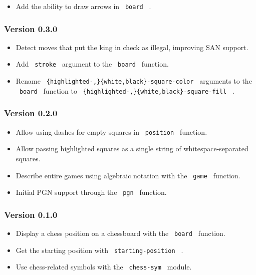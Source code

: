 \begin{itemize}
\tightlist
\item
  Add the ability to draw arrows in \texttt{\ board\ } .
\end{itemize}

\subsubsection{Version 0.3.0}\label{version-0.3.0}

\begin{itemize}
\item
  Detect moves that put the king in check as illegal, improving SAN
  support.
\item
  Add \texttt{\ stroke\ } argument to the \texttt{\ board\ } function.
\item
  Rename \texttt{\ \{highlighted-,\}\{white,black\}-square-color\ }
  arguments to the \texttt{\ board\ } function to
  \texttt{\ \{highlighted-,\}\{white,black\}-square-fill\ } .
\end{itemize}

\subsubsection{Version 0.2.0}\label{version-0.2.0}

\begin{itemize}
\item
  Allow using dashes for empty squares in \texttt{\ position\ }
  function.
\item
  Allow passing highlighted squares as a single string of
  whitespace-separated squares.
\item
  Describe entire games using algebraic notation with the
  \texttt{\ game\ } function.
\item
  Initial PGN support through the \texttt{\ pgn\ } function.
\end{itemize}

\subsubsection{Version 0.1.0}\label{version-0.1.0}

\begin{itemize}
\item
  Display a chess position on a chessboard with the \texttt{\ board\ }
  function.
\item
  Get the starting position with \texttt{\ starting-position\ } .
\item
  Use chess-related symbols with the \texttt{\ chess-sym\ } module.
\end{itemize}


